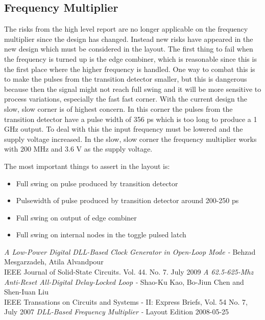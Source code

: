 \documentclass[a4paper,12pt]{article} \usepackage{graphicx}
\begin{document}
\subsection{Frequency Multiplier}
The risks from the high level report are no longer applicable on the frequency
multiplier since the design has changed. Instead new risks have appeared in the
new design which must be considered in the layout. The first thing to fail when
the frequency is turned up is the edge combiner, which is reasonable since this
is the first place where the higher frequency is handled. One way to combat this
is to make the pulses from the transition detector smaller, but this is
dangerous because then the signal might not reach full swing and it will be more
sensitive to process variations, especially the fast fast corner. With the
current design the slow, slow corner is of highest concern. In this corner the
pulses from the transition detector have a pulse width of 356 ps which is too
long to produce a 1 GHz output. To deal with this the input frequency must be
lowered and the supply voltage increased. In the slow, slow corner the frequency
multiplier works with 200 MHz and 3.6 V as the supply voltage.

The most important things to assert in the layout is:
\begin{itemize}
        \item Full swing on pulse produced by transition detector
        \item Pulsewidth of pulse produced by transition detector around 200-250 ps
        \item Full swing on output of edge combiner
        \item Full swing on internal nodes in the toggle pulsed latch
\end{itemize}

\newpage 
\appendix 
\newpage

\begin{thebibliography}{99}
        \textit{A Low-Power Digital DLL-Based Clock Generator in Open-Loop Mode - }
                Behzad Mesgarzadeh, Atila Alvandpour \\
                IEEE Journal of Solid-State Circuits. Vol. 44. No. 7. July 2009
        \textit{A 62.5-625-Mhz Anti-Reset All-Digital Delay-Locked Loop - }
                Shao-Ku Kao, Bo-Jiun Chen and Shen-Iuan Liu \\
                IEEE Transations on Circuits and Systems - II: Express Briefs, Vol. 54 No. 7, July 2007
        \textit{DLL-Based Frequency Multiplier - }
                Layout Edition 2008-05-25 

\end{thebibliography}
\end{document}
